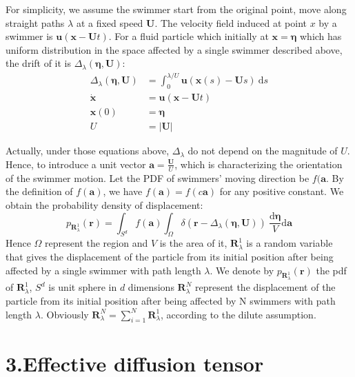 \documentclass[12pt,a4paper]{article}
\begin{document}
For simplicity, we assume the swimmer start from the original point,
move along straight paths $\lambda$ at a fixed speed $\bm U$. The velocity field
induced at point $x$ by a swimmer is $\bm u(\bm x-\bm{U}t)$. For a fluid particle
which initially at $\bm{x}=\bm{\eta}$ which has uniform distribution in the space
affected by a single swimmer described above, the drift of it is
$\Delta_{\lambda}(\bm \eta,\bm U)$:
\begin{equation}
  \label{eq:1}
  \begin{aligned}
    \Delta_{\lambda}(\bm\eta,\bm U)&=\int^{\lambda/U}_{0}\bm{u}(\bm{x}(s)-\bm{U}s)\
    \mathrm{d}s\\
    \dot{\bm{x}}&=\bm{u}(\bm{x}-\bm{U}t)\\
    \bm{x}(0)&=\bm{\eta}\\
    U&=|\bm{U}|
  \end{aligned}
\end{equation}

Actually, under those equations above, $\Delta_{\lambda}$ do not depend on the
magnitude of $U$. Hence, to introduce a unit vector
$\bm{a}=\frac{\bm{U}}{U}$, which is characterizing the orientation of
the swimmer motion. Let the PDF of swimmers' moving direction be
$f(\bm{a}$. By the definition of $f(\bm{a})$, we have
$f(\bm{a})=f(c\bm{a})$ for any positive constant. We obtain the
probability density of displacement:
\begin{equation}
  \label{eq:2}
  p_{\bm{R}^{1}_{\lambda}}(\bm{r})=\int_{S^{d}}f(\bm{a})\int_{\Omega}\delta(\bm{r}-\Delta_{\lambda}(\bm{\eta},\bm{U}))\
  \frac{\mathrm{d\bm{\eta}}}{V}\mathrm{d}\bm{a}
\end{equation}
Hence $\Omega$ represent the region and $V$ is the area of it,
$\bm{R}^{1}_{\lambda}$ is a random variable that gives the displacement of
the particle from its initial position after being affected by a
single swimmer with path length $\lambda$. We denote by
$p_{\bm{R}^{1}_{\lambda}}(\bm{r})$ the pdf of $\bm{R}^{1}_{\lambda}$, $S^{d}$ is
unit sphere in $d$ dimensions $\bm{R}^{N}_{\lambda}$ represent the
displacement of the particle from its initial position after being
affected by N swimmers with path length $\lambda$. Obviously
$\bm{R}^{N}_{\lambda}=\sum_{i=1}^{N}\bm{R}^{1}_{\lambda}$, according to the dilute
assumption.

\section*{\normalsize{3.Effective diffusion tensor}}
\end{document}

